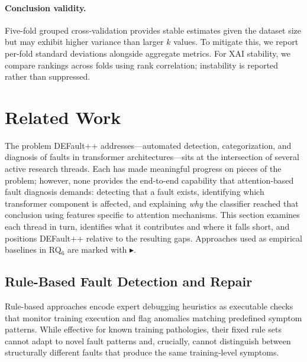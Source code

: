 \paragraph{Conclusion validity.}
Five-fold grouped cross-validation provides stable estimates given the dataset size but may exhibit higher variance than larger $k$ values. To mitigate this, we report per-fold standard deviations alongside aggregate metrics. For XAI stability, we compare rankings across folds using rank correlation; instability is reported rather than suppressed.

\section{Related Work}
\label{sec:defaultpp_related}

The problem DEFault++ addresses---automated detection, categorization, and diagnosis of faults in transformer architectures---sits at the intersection of several active research threads. Each has made meaningful progress on pieces of the problem; however, none provides the end-to-end capability that attention-based fault diagnosis demands: detecting that a fault exists, identifying which transformer component is affected, and explaining \emph{why} the classifier reached that conclusion using features specific to attention mechanisms. This section examines each thread in turn, identifies what it contributes and where it falls short, and positions DEFault++ relative to the resulting gaps. Approaches used as empirical baselines in RQ$_6$ are marked with $\blacktriangleright$.

\subsection{Rule-Based Fault Detection and Repair}
\label{subsec:rw_rule_based}

Rule-based approaches encode expert debugging heuristics as executable checks that monitor training execution and flag anomalies matching predefined symptom patterns. While effective for known training pathologies, their fixed rule sets cannot adapt to novel fault patterns and, crucially, cannot distinguish between structurally different faults that produce the same training-level symptoms.


